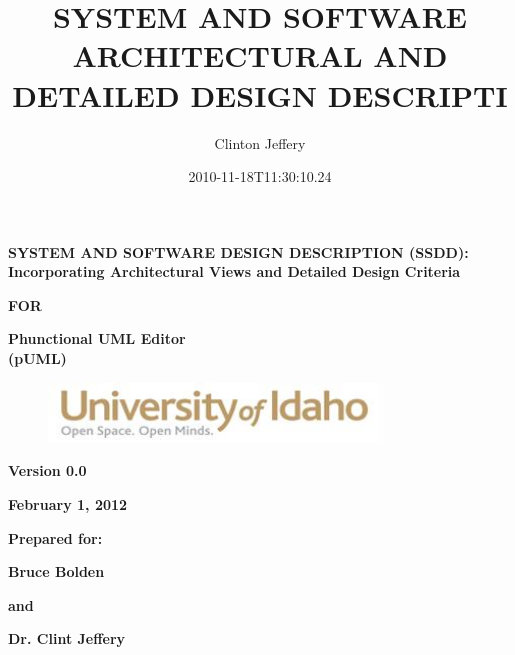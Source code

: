 \documentclass[twoside,letterpaper]{article}
\title{SYSTEM AND SOFTWARE ARCHITECTURAL AND DETAILED DESIGN DESCRIPTI}
\author{Clinton Jeffery}
\date{2010-11-18T11:30:10.24}
\begin{document}
\clearpage

{\centering{}\bfseries\color{black}
SYSTEM AND SOFTWARE DESIGN DESCRIPTION (SSDD): Incorporating
Architectural Views and Detailed Design Criteria
\par}

{\centering{}\bfseries\color{black}
FOR
\par}


\bigskip

{\centering{}\bfseries\color{black}
Phunctional UML Editor
\\(pUML)
\par}


\bigskip


\bigskip


\bigskip

{\centering \par}

\begin{figure}
\centering
\includegraphics[width=3.5in]{uidahologo.jpg}
\end{figure}

\bigskip


\bigskip


\bigskip


\bigskip

{\centering{}\bfseries\color{black}
Version 0.0
\par}

{\centering{}\bfseries\color{black}
February 1, 2012
\par}


\bigskip


\bigskip

{\centering{}\bfseries\color{black}
Prepared for:
\par}
{\centering{}\bfseries\color{black}
Bruce Bolden
\par}
{\centering{}\bfseries\color{black}
and
\par}
{\centering{}\bfseries\color{black}
Dr. Clint Jeffery
\par}

\bigskip


\bigskip
\end{document}
